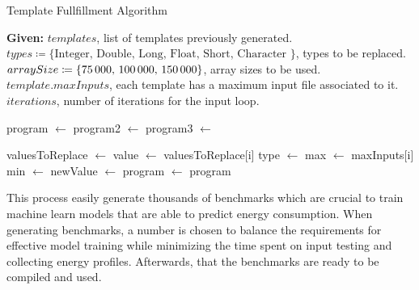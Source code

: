 \begin{algorithm}[htbp]
\caption{Template Fullfillment Algorithm}
\label{alg:template_fullfillment_algorithm}
\begin{algorithmic}[1]
    \Statex \textbf{Given:}
    \Statex \hspace{\algorithmicindent} $templates$, list of templates previously generated.
    \Statex \hspace{\algorithmicindent} $types \coloneqq \{\text{Integer, Double, Long, Float, Short, Character }\}$, types to be replaced.
    \Statex \hspace{\algorithmicindent} $arraySize \coloneqq \{\text{75\,000, 100\,000, 150\,000}\}$, array sizes to be used.
    \Statex \hspace{\algorithmicindent} $template.maxInputs $, each template has a maximum input file associated to it.
    \Statex \hspace{\algorithmicindent} $iterations $, number of iterations for the input loop.

            \State program $\gets$ 
                    \State program2 $\gets$ 
                            \State program3 $\gets$ 
                            \State {}
                        \EndFor
                \EndFor
        \EndFor
    \EndFor
    
\EndProcedure

\vspace{1em} 

    \State valuesToReplace $\gets$ 
        \State value $\gets$ valuesToReplace[i]
        \State type $\gets$ 
        \State max $\gets$ maxInputs[i]
        \State min $\gets$ 
        \State newValue $\gets$ 
        \State program $\gets$ 
    \EndFor
    \State \Return program
\EndProcedure

\end{algorithmic}
\end{algorithm}

This process easily generate thousands of benchmarks which are crucial to train machine learn models that are able to predict energy consumption. When generating benchmarks, a number is chosen to balance the requirements for effective model training while minimizing the time spent on input testing and collecting energy profiles. Afterwards, that the benchmarks are ready to be compiled and used.